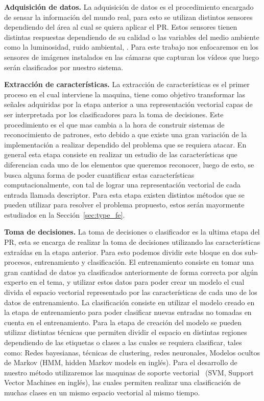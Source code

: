 	\textbf{Adquisición de datos.} La adquisición de datos es el procedimiento encargado de sensar la información del mundo real, para esto se utilizan distintos sensores dependiendo del área al cual se quiera aplicar el PR. Estos sensores tienen distintas respuestas dependiendo de su calidad o las variables del medio ambiente como la luminosidad, ruido ambiental, \etc. Para este trabajo nos enfocaremos en los sensores de imágenes instalados en las cámaras que capturan los vídeos que luego serán clasificados por nuestro sistema.
	
	\textbf{Extracción de características.} La extracción de características es el primer proceso en el cual interviene la maquina, tiene como objetivo transformar las señales adquiridas por la etapa anterior a una representación vectorial capas de ser interpretada por los clasificadores para la toma de decisiones. Este procedimiento es el que mas cambia a la hora de construir sistemas de reconocimiento de patrones, esto debido a que existe una gran variación de la implementación a realizar dependido del problema que se requiera atacar. En general esta etapa consiste en realizar un estudio de las características que diferencian cada uno de los elementos que queremos reconocer, luego de esto, se busca alguna forma de poder cuantificar estas características computacionalmente, con tal de lograr una representación vectorial de cada entrada llamada descriptor. Para esta etapa existen distintos métodos que se pueden utilizar para resolver el problema propuesto, estos serán mayormente estudiados en la Sección~\ref{sec:type_fe}.
	
	\textbf{Toma de decisiones.} La toma de decisiones o clasificador es la ultima etapa del PR, esta se encarga de realizar la toma de decisiones utilizando las características extraídas en la etapa anterior. Para esto podemos dividir este bloque en dos sub-procesos, entrenamiento y clasificación. El entrenamiento consiste en tomar una gran cantidad de datos ya clasificados anteriormente de forma correcta por algún experto en el tema, y utilizar estos datos para poder crear un modelo el cual divida el espacio vectorial representado por las características de cada uno de los datos de entrenamiento. La clasificación consiste en utilizar el modelo creado en la etapa de entrenamiento para poder clasificar nuevas entradas no tomadas en cuenta en el entrenamiento. Para la etapa de creación del modelo se pueden utilizar distintas técnicas que permiten dividir el espacio en distintas regiones dependiendo de las etiquetas o clases a las cuales se requiera clasificar, tales como: Redes bayesianas, técnicas de clustering, redes neuronales, Modelos ocultos de Markov (HMM, hidden Markov models en inglés). Para el desarrollo de nuestro método utilizaremos las maquinas de soporte vectorial~\cite{Cortes1995,Hearst1998} (SVM, Support Vector Machines en inglés), las cuales permiten realizar una clasificación de muchas clases en un mismo espacio vectorial al mismo tiempo. 


